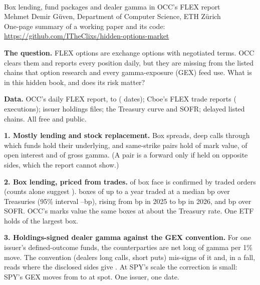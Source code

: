 \documentclass[10pt]{article}
\begin{document}
\\[0.2em]
{\large Box lending, fund packages and dealer gamma in OCC's FLEX report}\\[0.3em]
Mehmet Demir G\"uven, Department of Computer Science, ETH Z\"urich\\[0.2em]
\small One-page summary of a working paper and its code:
\url{https://github.com/ITheClixs/hidden-options-market}

\medskip
\noindent\textbf{The question.} FLEX options are exchange options with negotiated
terms. OCC clears them and reports every position daily, but they are missing from the
listed chains that option research and every gamma-exposure (GEX) feed use. What is in
this hidden book, and does its risk matter?

\medskip
\noindent\textbf{Data.} OCC's daily FLEX report, \PanelStart{} to \PanelEnd{}
(\PanelDates{} dates); Cboe's FLEX trade reports (\BoxRExecutions{} executions); issuer
holdings files; the Treasury curve and SOFR; delayed listed chains. All free and public.

\medskip
\noindent\textbf{1. Mostly lending and stock replacement.} Box spreads, deep calls
through which funds hold their underlying, and same-strike pairs hold
\AnatFinancingValueShare{} of mark value, \AnatNonOptionOIShare{} of open interest and
\AnatNonOptionGamma{} of gross gamma. (A pair is a forward only if held on opposite
sides, which the report cannot show.)

\medskip
\noindent\textbf{2. Box lending, priced from trades.} \BoxRTradedFace{} of box face is
confirmed by traded orders (counts alone suggest \AnatBoxFace{}).
\BoxRHeadlineTrades{} boxes of up to a year traded at a median \BoxRSpreadMedian{}bp
over Treasuries (95\% interval \BoxRMedianLow{}--\BoxRMedianHigh{}bp), rising from
\BoxRYearTwentyTwentyFive{}bp in 2025 to \BoxRYearTwentyTwentySix{}bp in 2026, and
\BoxRSofrMedian{}bp over SOFR. OCC's marks value the same boxes at about the Treasury
rate. One ETF holds \HoldBoxShareOfItsBox{} of the largest box.

\medskip
\noindent\textbf{3. Holdings-signed dealer gamma against the GEX convention.} For one
issuer's \HoldFlexFunds{} defined-outcome funds, the counterparties are net long
\HoldGammaNet{} of gamma per 1\% move. The convention (dealers long calls, short puts)
mis-signs \HoldGammaWrong{} of it and, in a \HoldProfileDrop{} fall, reads
\HoldProfileDropConvention{} where the disclosed sides give \HoldProfileDropDealer{}.
At SPY's scale the correction is small: SPY's GEX moves from \GexConventionSpot{} to
\GexSignedSpot{} at spot. One issuer, one date.
\end{document}
